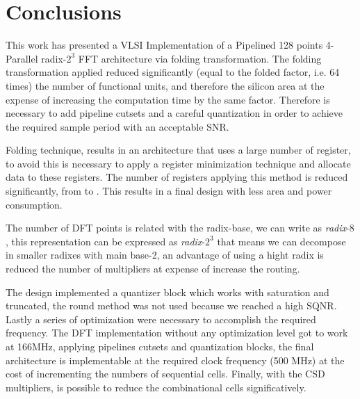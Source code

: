\documentclass[journal,comsoc]{IEEEtran}
\begin{document}

%


	







 
\section{Conclusions} \label{sec:conclusions}
This work has presented a VLSI Implementation of a Pipelined 128 points 4-Parallel radix-$2^3$ FFT architecture via folding transformation.
The folding transformation applied reduced significantly (equal to the folded factor, i.e. 64 times) the number of functional units, and therefore the silicon area at the expense of increasing the computation time by the same factor. Therefore is necessary to add pipeline cutsets and a careful quantization in order to achieve the required sample period with an acceptable SNR.

Folding technique, results in an architecture that uses a large number of register, to avoid this is necessary to apply a register minimization technique and allocate data to these registers. The number of registers applying this method is reduced significantly, from  to . This results in a final design with less area and power consumption. %

The number of DFT points is related with the radix-base, we can write as \textit{radix}-$8$, this representation can be expressed as \textit{radix}-$2^3$ that means we can decompose in smaller radixes with main base-2, an advantage of using a hight radix is reduced the number of multipliers at expense of increase the routing.

The design implemented a quantizer block which works with saturation and truncated, the round method was not used because we reached a high SQNR. Lastly a series of optimization were necessary to accomplish the required frequency. The DFT implementation without any optimization level got to work at 166MHz, applying pipelines cutsets and quantization blocks, the final architecture is implementable at the required clock frequency (500 MHz) at the cost of incrementing the numbers of sequential cells. Finally, with the CSD multipliers, is possible to reduce the combinational cells significatively. 
\end{document}
